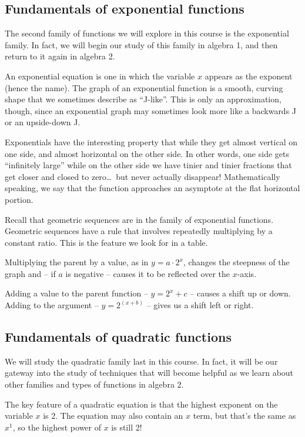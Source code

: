 \subsection{Fundamentals of exponential functions}

The second family of functions we will explore in this course is the exponential family. In fact, we will begin our study of this family in algebra 1, and then return to it again in algebra 2.

An exponential equation is one in which the variable $x$ appears as the exponent (hence the name). The graph of an exponential function is a smooth, curving shape that we sometimes describe as ``J-like''. This is only an approximation, though, since an exponential graph may sometimes look more like a backwards J or an upside-down J.

Exponentials have the interesting property that while they get almost vertical on one side, and almost horizontal on the other side. In other words, one side gets ``infinitely large'' while on the other side we have tinier and tinier fractions that get closer and closed to zero\ldots\ but never actually disappear! Mathematically speaking, we say that the function approaches an \gls{asymptote} at the flat horizontal portion.

Recall that geometric sequences are in the family of exponential functions. Geometric sequences have a rule that involves repeatedly multiplying by a constant ratio. This is the feature we look for in a table.

Multiplying the parent by a value, as in $y=a\cdot2^x$, changes the steepness of the graph and -- if $a$ is negative -- causes it to be reflected over the $x$-axis.

Adding a value to the parent function -- $y=2^x+c$ -- causes a shift up or down. Adding to the argument -- $y = 2^{(x+b)}$ -- gives us a shift left or right.


\subsection{Fundamentals of quadratic functions}

We will study the quadratic family last in this course. In fact, it will be our gateway into the study of techniques that will become helpful as we learn about other families and types of functions in algebra 2.

The key feature of a quadratic equation is that the highest exponent on the variable $x$ is 2. The equation may also contain an $x$ term, but that's the same as $x^1$, so the highest power of $x$ is still 2!

